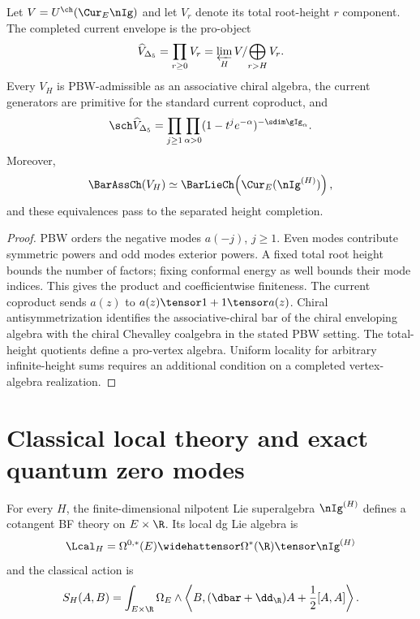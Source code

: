 \begin{theorem}
Let $V=U^{\ch}(\Cur_E\nIg)$ and let $V_r$ denote its
total root-height $r$ component. The completed current
envelope is the pro-object
\[
 \widehat V_{\Delta_5}=\prod_{r\ge0}V_r
   =\varprojlim_H V/\!\bigoplus_{r>H}V_r.
\]
Every $V_H$ is PBW-admissible as an associative chiral algebra, the current generators are primitive for the standard current coproduct, and
\[
 \sch\widehat V_{\Delta_5}
 =\prod_{j\ge1}\prod_{\alpha>0}
 (1-t^je^{-\alpha})^{-\sdim\gIg_\alpha}.
\]
Moreover,
\[
 \BarAssCh(V_H)
 \simeq
 \BarLieCh\!\left(\Cur_E(\nIg^{(H)})\right),
\]
and these equivalences pass to the separated height completion.
\end{theorem}
\begin{proof}
PBW orders the negative modes $a(-j)$, $j\ge1$.
Even modes contribute symmetric powers and odd modes
exterior powers. A fixed total root height bounds the
number of factors; fixing conformal energy as well
bounds their mode indices. This gives the product and
coefficientwise finiteness. The current coproduct sends
$a(z)$ to $a(z)\tensor1+1\tensor a(z)$.
Chiral antisymmetrization identifies the associative-chiral
bar of the chiral enveloping algebra with the chiral
Chevalley coalgebra in the stated PBW setting.
The total-height quotients define a pro-vertex algebra.
Uniform locality for arbitrary infinite-height sums
requires an additional condition on a completed
vertex-algebra realization.
\end{proof}

\section{Classical local theory and exact quantum zero modes}
For every $H$, the finite-dimensional nilpotent Lie superalgebra $\nIg^{(H)}$ defines a cotangent BF theory on $E\times\R$.  Its local dg Lie algebra is
\[
 \Lcal_H=\Omega^{0,*}(E)\widehattensor\Omega^*(\R)\tensor\nIg^{(H)}
\]
and the classical action is
\[
 S_H(A,B)=\int_{E\times\R}\Omega_E\wedge
 \left\langle B,(\dbar+\dd_{\R})A+\frac12[A,A]\right\rangle .
\]

